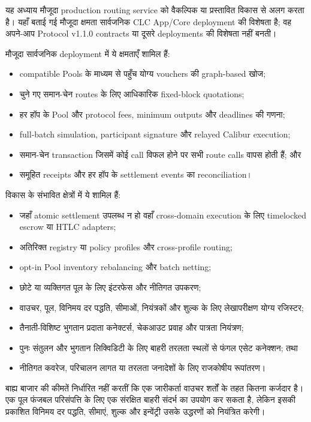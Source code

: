 \documentclass[11pt]{article}
\begin{document}
यह अध्याय मौजूदा production routing service को वैकल्पिक या प्रस्तावित विकास से अलग करता है। यहाँ बताई गई मौजूदा क्षमता सार्वजनिक CLC App/Core deployment की विशेषता है; वह अपने-आप Protocol v1.1.0 contracts या दूसरे deployments की विशेषता नहीं बनती।

मौजूदा सार्वजनिक deployment में ये क्षमताएँ शामिल हैं:

\begin{itemize}[leftmargin=*]
\item compatible Pools के माध्यम से पहुँच योग्य vouchers की graph-based खोज;
\item चुने गए समान-चेन routes के लिए आधिकारिक fixed-block quotations;
\item हर हॉप के Pool और protocol fees, minimum outputs और deadlines की गणना;
\item full-batch simulation, participant signature और relayed Calibur execution;
\item समान-चेन transaction जिसमें कोई call विफल होने पर सभी route calls वापस होती हैं; और
\item समूहित receipts और हर हॉप के settlement events का reconciliation।
\end{itemize}
विकास के संभावित क्षेत्रों में ये शामिल हैं:

\begin{itemize}[leftmargin=*]
\item जहाँ atomic settlement उपलब्ध न हो वहाँ cross-domain execution के लिए timelocked escrow या HTLC adapters;
\item अतिरिक्त registry या policy profiles और cross-profile routing;
\item opt-in Pool inventory rebalancing और batch netting;
\item छोटे या व्यक्तिगत पूल के लिए इंटरफेस और नीतिगत उपकरण;
\item वाउचर, पूल, विनिमय दर पद्धति, सीमाओं, नियंत्रकों और शुल्क के लिए लेखापरीक्षण योग्य रजिस्टर;
\item तैनाती-विशिष्ट भुगतान प्रदाता कनेक्टर्स, चेकआउट प्रवाह और पात्रता नियंत्रण;
\item पुनः संतुलन और भुगतान लिक्विडिटी के लिए बाहरी तरलता स्थलों से फंगल एसेट कनेक्शन; तथा
\item नीतिगत कवरेज, परिचालन लागत या तरलता जनादेशों के लिए राजकोषीय रूपांतरण।
\end{itemize}
बाह्य बाजार की कीमतें निर्धारित नहीं करतीं कि एक जारीकर्ता वाउचर शर्तों के तहत कितना कर्जदार है। एक पूल फंजबल परिसंपत्ति के लिए एक संरक्षित बाहरी संदर्भ का उपयोग कर सकता है, लेकिन इसकी प्रकाशित विनिमय दर पद्धति, सीमाएं, शुल्क और इन्वेंट्री उसके उद्धरणों को नियंत्रित करेगी।
\end{document}

